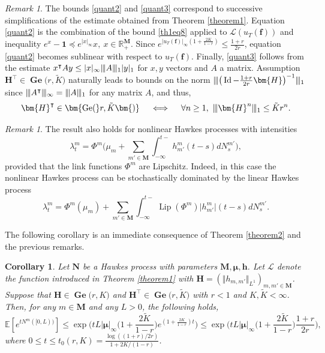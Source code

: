 \documentclass[reqno,final,11pt]{amsart}
\theoremstyle{plain}
\newtheorem{corollary}[theorem]{Corollary}
\theoremstyle{definition}
\theoremstyle{remark}
\newtheorem{remark}[theorem]{Remark}
\newcommand{\R}{\mathds{R}}
\newcommand{\E}[1]{\mathds{E}\left[#1\right]}
\newcommand{\itg}{\displaystyle\int}
\newcommand{\M}{\bm{M}}
\newcommand{\Ge}[2]{\bm{\Gel(} #1,#2 \bm{)} }
\renewcommand{\L}{\bm{\mathscr{L}}}
\newcommand{\ones}{\bm{1}}
\newcommand{\h}{\bm{h}}
\renewcommand{\H}{\bm{H}}
\newcommand{\Vone}[1]{\Vert #1 \Vert_{L^1}}
\newcommand{\pos}{\R_+^{\M}}
\newcommand{\Vvert}{\vert \hspace{-1pt} \vert \hspace{-1pt} \vert}
\newcommand{\trp}{^{\intercal}}
\DeclareMathOperator{\Gel}{Ge}
\DeclareMathOperator{\Id}{Id}
\DeclareMathOperator{\Lip}{Lip}
\begin{document}
\begin{remark}
	The bounds \eqref{quant2} and \eqref{quant3} correspond to successive simplifications of the estimate obtained from Theorem \ref{theorem1}. Equation \eqref{quant2} is the combination of the bound \eqref{th1eq8} applied to $\L(u_T(\bm{f}))$ and inequality $e^x-\ones \preceq e^{\vert x\vert_{\infty}} x, \ x\in\pos$. Since $e^{\vert u_T(\bm{f}) \vert_{\infty}(1+\frac{2K}{1-r})} \leq \frac{1+r}{2r}$, equation \eqref{quant2} becomes sublinear with respect to $u_T(\bm{f})$. Finally, \eqref{quant3} follows from the estimate $x\trp A y \leq \vert x\vert_{\infty} \Vvert A\Vvert_1 \vert y\vert_1$ for $x,y$ vectors and $A$ a matrix. Assumption $\H\trp \in \Ge{r}{\tilde{K}}$ naturally leads to bounds on the norm $\Vvert \big(\Id-\frac{1+r}{2r}\H\big)^{-1}\Vvert_1$ since $\Vvert A\trp \Vvert_{\infty} = \Vvert A \Vvert_{1}$ for any matrix $A$, and thus,
	\begin{equation*}
		\H^{\intercal} \in \Ge{r}{\tilde{K}} \quad \iff \quad \forall n\geq 1, \  \Vvert \H^n \Vvert_{1} \leq \tilde{K} r^n.
	\end{equation*}
\end{remark}

\begin{remark}
	The result also holds for nonlinear Hawkes processes with intensities
	\begin{equation*}
		\lambda^m_t = \Phi^m\Big(\mu_m + \sum_{m'\in\M}\itg_{-\infty}^{t-} h^m_{m'}(t-s)dN^{m'}_s\Big),
	\end{equation*} 
	provided that the link functions $\Phi^m$ are Lipschitz. Indeed, in this case the nonlinear Hawkes process can be stochastically dominated by the linear Hawkes process
	\begin{equation*}
		\lambda^m_t = \Phi^m(\mu_m) + \sum_{m'\in\M}\itg_{-\infty}^{t-} \Lip(\Phi^m) \vert h^m_{m'}\vert (t-s)dN^{m'}_s.
	\end{equation*}
\end{remark}

The following corollary is an immediate consequence of Theorem \ref{theorem2} and the previous remarks.

\begin{corollary}\label{cor3.14}
	Let $\bm{N}$ be a Hawkes process with parameters $\M,\bm{\mu},\h$. Let $\L$ denote the function introduced in Theorem \ref{theorem1} with $\H = (\Vone{h_{m,m'}})_{m,m'\in\M}$. Suppose that $\H \in \Ge{r}{K}$ and $\H^{\intercal} \in \Ge{r}{\tilde{K}}$ with $r<1$ and $K,\tilde{K} <\infty$. Then, for any $m\in\M$ and any $L>0$, the following holds,
	\begin{equation}
		\E{e^{tN^m([0,L))}} \leq \exp\Big( t L \vert \bm{\mu} \vert_{\infty} \big(1+\frac{2\tilde{K}}{1-r}\big) e^{(1+\frac{2K}{1-r})t}\Big) \leq \exp\Big( t L \vert \bm{\mu} \vert_{\infty} \big(1+\frac{2\tilde{K}}{1-r}\big) \frac{1+r}{2r} \Big),
	\end{equation}
	where $0\leq t\leq t_0(r,K) = \frac{\log((1+r)/2r)}{1+2K/(1-r)}$.
\end{corollary}
\end{document}
